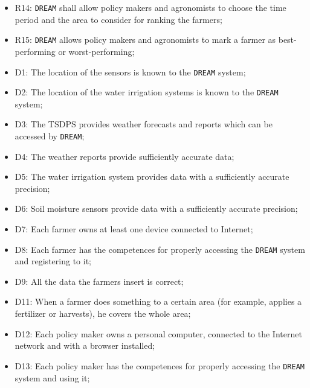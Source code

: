 \documentclass{article}
\begin{document}
\begin{itemize}
    \item R14: \verb|DREAM| shall allow policy makers and agronomists to choose the time period and the area to consider for ranking the farmers;
    
    \item R15: \verb|DREAM| allows policy makers and agronomists to mark a farmer as best-performing or worst-performing;
    
    \item D1: The location of the sensors is known to the \verb|DREAM| system;
    
    \item D2: The location of the water irrigation systems is known to the \verb|DREAM| system;
    
    \item D3: The TSDPS provides weather forecasts and reports which can be accessed by \verb|DREAM|;
    
    \item D4: The weather reports provide sufficiently accurate data;
    
    \item D5: The water irrigation system provides data with a sufficiently accurate precision;
    
    \item D6: Soil moisture sensors provide data with a sufficiently accurate precision;
    
    \item D7: Each farmer owns at least one device connected to Internet;
    
    \item D8: Each farmer has the competences for properly accessing the \verb|DREAM| system and registering to it;
    
    \item D9: All the data the farmers insert is correct;
    
    \item D11: When a farmer does something to a certain area (for example, applies a fertilizer or harvests), he covers the whole area;
    
    \item D12: Each policy maker owns a personal computer, connected to the Internet network and with a browser installed;
    
    \item D13: Each policy maker has the competences for properly accessing the \verb|DREAM| system and using it;
    

\end{itemize}
\end{document}
